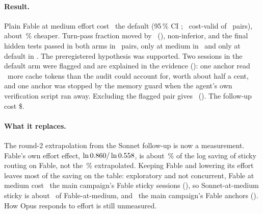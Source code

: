 \paragraph{Result.} Plain Fable at medium effort cost \EfRatio\X\ the default (95\,\% CI \EfCI; \EfValid\ cost-valid of
\EfPairs\ pairs), about \EfCutPct\,\% cheaper. Turn-pass fraction moved by \EfQual\ (\EfQualCI), non-inferior, and the
final hidden tests passed in both arms in \EfFinalBoth\ pairs, only at medium in \EfFinalMed\ and only at default in
\EfFinalDef. The preregistered hypothesis was supported. Two sessions in the default arm were flagged and are explained
in the evidence (): one anchor read \EfSurplusTokens\ more cache tokens than the audit could account
for, worth about half a cent, and one anchor was stopped by the memory guard when the agent's own verification script
ran away. Excluding the flagged pair gives \EfStrict\ (\EfStrictCI). The follow-up cost \$\EfSpend.

\paragraph{What it replaces.} The round-2 extrapolation from the Sonnet follow-up is now a measurement. Fable's own
effort effect, $\ln 0.860 / \ln 0.558$, is about \EfShare\,\% of the log saving of sticky routing on
Fable, not the \RgEffShareFable\,\% extrapolated. Keeping Fable and lowering its effort leaves most of the saving on the
table: exploratory and not concurrent, Fable at medium cost \EfVsSticky\X\ the main campaign's Fable sticky sessions
(\EfVsStickyCI), so Sonnet-at-medium sticky is about \EfStickyVsMedium\X\ of Fable-at-medium, and \EfVsAnchor\X\ the
main campaign's Fable anchors (\EfVsAnchorCI). How Opus responds to effort is still unmeasured.
